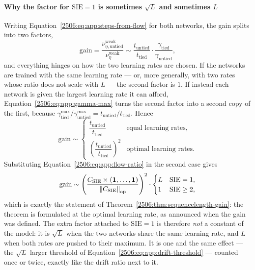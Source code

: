 \paragraph{Why the factor for \(\mathrm{SIE}=1\) is sometimes \(\sqrt{L}\) and sometimes \(L\)}
Writing Equation~\eqref{2506:eq:app:steps-from-flow} for both networks, the gain splits into two factors,
\begin{equation} \label{2506:eq:app:gain-breakdown}
    \mathrm{gain} = \frac{\nu^\mathrm{weak}_{\eta,\mathrm{untied}}}{\nu^\mathrm{weak}_\eta} \sim \frac{t_\mathrm{untied}}{t_\mathrm{tied}} \cdot \frac{\gamma_\mathrm{tied}}{\gamma_\mathrm{untied}},
\end{equation}
and everything hinges on how the two learning rates are chosen. If the networks are trained with the same learning rate --- or, more generally, with two rates whose ratio does not scale with \(L\) --- the second factor is \(1\). If instead each network is given the largest learning rate it can afford, Equation~\eqref{2506:eq:app:gamma-max} turns the second factor into a second copy of the first, because \(\gamma_\mathrm{tied}^\mathrm{max}/\gamma_\mathrm{untied}^\mathrm{max} = t_\mathrm{untied}/t_\mathrm{tied}\). Hence
\begin{equation} \label{2506:eq:app:gain-two-regimes}
    \mathrm{gain} \sim \begin{cases}
        \dfrac{t_\mathrm{untied}}{t_\mathrm{tied}} & \text{equal learning rates},\\[2.5ex]
        \left(\dfrac{t_\mathrm{untied}}{t_\mathrm{tied}}\right)^{2} & \text{optimal learning rates}.
    \end{cases}
\end{equation}
Substituting Equation~\eqref{2506:eq:app:flow-ratio} in the second case gives
\begin{equation} \label{2506:eq:app:gain-optimal}
    \mathrm{gain} \sim \left(\frac{C_\mathrm{SIE} \times ({\boldsymbol{1}},\dots,{\boldsymbol{1}})}{\left\lVert C_\mathrm{SIE}\right\rVert_\mathrm{op}}\right)^{2} \cdot \begin{cases}
        L & \mathrm{SIE} = 1,\\
        1 & \mathrm{SIE} \ge 2,
    \end{cases}
\end{equation}
which is exactly the statement of Theorem~\ref{2506:thm:sequencelength-gain}: the theorem is formulated at the optimal learning rate, as announced when the gain was defined. The extra factor attached to \(\mathrm{SIE}=1\) is therefore \emph{not} a constant of the model: it is \(\sqrt{L}\) when the two networks share the same learning rate, and \(L\) when both rates are pushed to their maximum. It is one and the same effect --- the \(\sqrt{L}\) larger threshold of Equation~\eqref{2506:eq:app:drift-threshold} --- counted once or twice, exactly like the drift ratio next to it.

